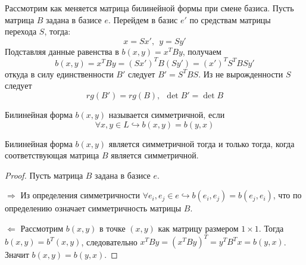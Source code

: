 
Рассмотрим как меняется матрица билинейной формы при смене базиса. Пусть матрица $B$ задана в базисе $e$. Перейдем в базис $e'$ по средствам матрицы перехода $S$, тогда:
\[
x=Sx', \ \ y=Sy'
\]
Подставляя данные равенства в $b(x,y)=x^TBy$, получаем
\[
b(x,y)=x^TBy=(Sx')^TB(Sy')=(x')^TS^TBSy'
\]
откуда в силу единственности $B'$ следует $B'=S^TBS$. Из не вырожденности $S$ следует \[
rg(B')=rg(B), \ \ \det B'=\det B
\]

\begin{definition}
    Билинейная форма $b(x,y)$ называется симметричной, если \[
    \forall x,y\in L \hookrightarrow b(x,y)=b(y,x)
    \]
\end{definition}
\begin{proposition}
    Билинейная форма $b(x,y)$ является симметричной тогда и только тогда, когда соответствующая матрица $B$ является симметричной.
\end{proposition}
\begin{proof}  
    Пусть матрица $B$ задана в базисе  $e$.
    
    $\Rightarrow$ Из определения симметричности $\forall e_i, e_j\in e \hookrightarrow b(e_i,e_j)=b(e_j,e_i)$, что по определению означает симметричность матрицы $B$.

    $\Leftarrow$ Рассмотрим $b(x,y)$ в точке $(x,y)$ как матрицу размером $1\times 1$. Тогда $b(x,y)=b^T(x,y)$, следовательно $x^TBy=(x^TBy)^T=y^TB^Tx=b(y,x)$. Значит $b(x,y)=b(y,x)$.
\end{proof}

